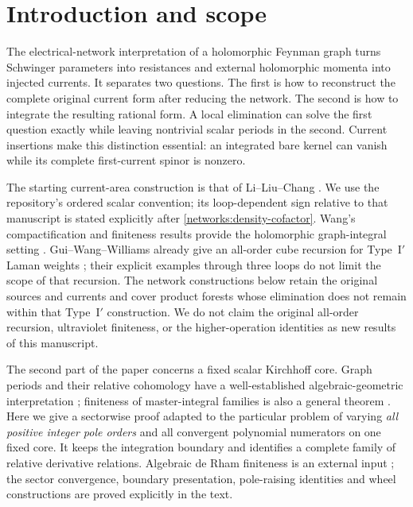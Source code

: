 \section{Introduction and scope}
\label{intro:scope}

The electrical-network interpretation of a holomorphic Feynman graph
turns Schwinger parameters into resistances and external holomorphic
momenta into injected currents. It separates two questions. The first
is how to reconstruct the complete original current form after reducing
the network. The second is how to integrate the resulting rational
form. A local elimination can solve the first question exactly while
leaving nontrivial scalar periods in the second. Current insertions make
this distinction essential: an integrated bare kernel can vanish while
its complete first-current spinor is nonzero.

The starting current-area construction is that of
Li--Liu--Chang \cite{li2026}. We use the repository's ordered scalar
convention; its loop-dependent sign relative to that manuscript is
stated explicitly after \eqref{networks:density-cofactor}.
Wang's compactification and finiteness
results provide the holomorphic graph-integral setting
\cite{wang2025}. Gui--Wang--Williams already give an all-order cube
recursion for Type~I$'$ Laman weights
\cite[Theorem~4.13 and Remark~4.14]{gui2025}; their explicit examples
through three loops do not limit the scope of that recursion. The
network constructions below retain the original sources and currents
and cover product forests whose elimination does not remain within
that Type~I$'$ construction. We do not claim the original all-order
recursion, ultraviolet finiteness, or the higher-operation identities as
new results of this manuscript.

The second part of the paper concerns a fixed scalar Kirchhoff core.
Graph periods and their relative cohomology have a well-established
algebraic-geometric interpretation \cite{bloch2006,brown2015}; finiteness
of master-integral families is also a general theorem
\cite{smirnov2010}. Here we give a sectorwise proof adapted to the
particular problem of varying \emph{all positive integer pole orders}
and all convergent polynomial numerators on one fixed core. It keeps the
integration boundary and identifies a complete family of relative
derivative relations. Algebraic de Rham finiteness is an external
input \cite{grothendieck1966}; the sector convergence, boundary
presentation, pole-raising identities and wheel constructions are
proved explicitly in the text.

